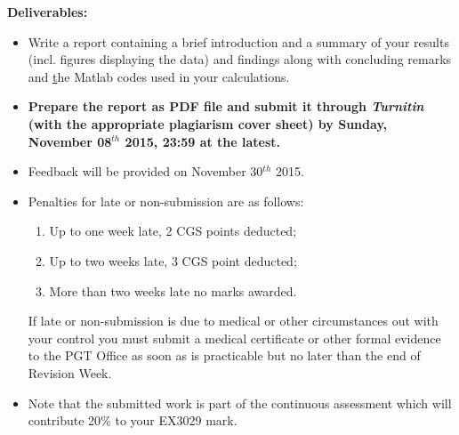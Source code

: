 \documentclass[12pts,a4paper,amsmath,amssymb,floatfix]{article}%
\begin{document}
{\bf Deliverables:}
\begin{itemize}
\item Write a report containing a brief introduction and a summary of your results (incl. figures displaying the data) and findings along with concluding remarks and {\underline the Matlab codes} used in your calculations. 
%
\item {\bf Prepare the report as PDF file and submit it through {\it Turnitin} (with the appropriate plagiarism cover sheet) by Sunday, November 08$^{th}$ 2015, 23:59 at the latest.}
%
\item Feedback will be provided on November 30$^{th}$ 2015.
%
\item Penalties for late or non-submission are as follows:
\begin{enumerate}%
\item Up to one week late, 2 CGS points deducted;
\item Up to two weeks late, 3 CGS point deducted;
\item More than two weeks late no marks awarded.
\end{enumerate}
If late or non-submission is due to medical or other circumstances out with your control you must submit a medical certificate or other formal evidence to the PGT Office as soon as is practicable but no later than the end of Revision Week.


\item Note that the submitted work is part of the continuous assessment which will contribute 20$\%$ to your EX3029 mark.

\end{itemize}



\clearpage

%
\end{document}
